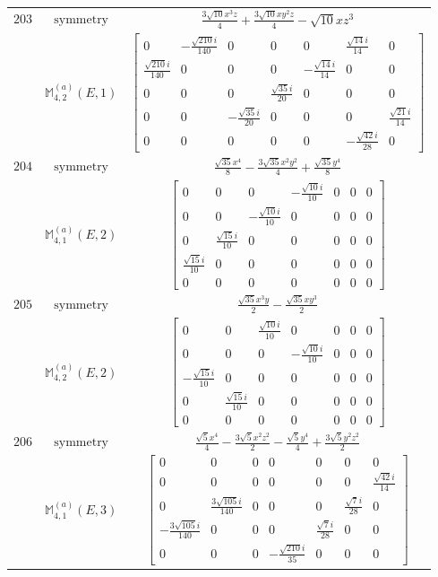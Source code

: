 \documentclass[fleqn,8pt,landscape]{jsarticle}
\begin{document}
\begin{longtable}{ccc}
$ 203 $ & $ \text{symmetry} $ & $ \frac{3 \sqrt{10} x^{3} z}{4} + \frac{3 \sqrt{10} x y^{2} z}{4} - \sqrt{10} x z^{3} $ \\
$  $ & $ \mathbb{M}_{4,2}^{(a)}(E,1) $ & $ \begin{bmatrix} 0 & - \frac{\sqrt{210} i}{140} & 0 & 0 & 0 & \frac{\sqrt{14} i}{14} & 0 \\ \frac{\sqrt{210} i}{140} & 0 & 0 & 0 & - \frac{\sqrt{14} i}{14} & 0 & 0 \\ 0 & 0 & 0 & \frac{\sqrt{35} i}{20} & 0 & 0 & 0 \\ 0 & 0 & - \frac{\sqrt{35} i}{20} & 0 & 0 & 0 & \frac{\sqrt{21} i}{14} \\ 0 & 0 & 0 & 0 & 0 & - \frac{\sqrt{42} i}{28} & 0 \end{bmatrix} $ \\ \hline
$ 204 $ & $ \text{symmetry} $ & $ \frac{\sqrt{35} x^{4}}{8} - \frac{3 \sqrt{35} x^{2} y^{2}}{4} + \frac{\sqrt{35} y^{4}}{8} $ \\
$  $ & $ \mathbb{M}_{4,1}^{(a)}(E,2) $ & $ \begin{bmatrix} 0 & 0 & 0 & - \frac{\sqrt{10} i}{10} & 0 & 0 & 0 \\ 0 & 0 & - \frac{\sqrt{10} i}{10} & 0 & 0 & 0 & 0 \\ 0 & \frac{\sqrt{15} i}{10} & 0 & 0 & 0 & 0 & 0 \\ \frac{\sqrt{15} i}{10} & 0 & 0 & 0 & 0 & 0 & 0 \\ 0 & 0 & 0 & 0 & 0 & 0 & 0 \end{bmatrix} $ \\ \hline
$ 205 $ & $ \text{symmetry} $ & $ \frac{\sqrt{35} x^{3} y}{2} - \frac{\sqrt{35} x y^{3}}{2} $ \\
$  $ & $ \mathbb{M}_{4,2}^{(a)}(E,2) $ & $ \begin{bmatrix} 0 & 0 & \frac{\sqrt{10} i}{10} & 0 & 0 & 0 & 0 \\ 0 & 0 & 0 & - \frac{\sqrt{10} i}{10} & 0 & 0 & 0 \\ - \frac{\sqrt{15} i}{10} & 0 & 0 & 0 & 0 & 0 & 0 \\ 0 & \frac{\sqrt{15} i}{10} & 0 & 0 & 0 & 0 & 0 \\ 0 & 0 & 0 & 0 & 0 & 0 & 0 \end{bmatrix} $ \\ \hline
$ 206 $ & $ \text{symmetry} $ & $ \frac{\sqrt{5} x^{4}}{4} - \frac{3 \sqrt{5} x^{2} z^{2}}{2} - \frac{\sqrt{5} y^{4}}{4} + \frac{3 \sqrt{5} y^{2} z^{2}}{2} $ \\
$  $ & $ \mathbb{M}_{4,1}^{(a)}(E,3) $ & $ \begin{bmatrix} 0 & 0 & 0 & 0 & 0 & 0 & 0 \\ 0 & 0 & 0 & 0 & 0 & 0 & \frac{\sqrt{42} i}{14} \\ 0 & \frac{3 \sqrt{105} i}{140} & 0 & 0 & 0 & \frac{\sqrt{7} i}{28} & 0 \\ - \frac{3 \sqrt{105} i}{140} & 0 & 0 & 0 & \frac{\sqrt{7} i}{28} & 0 & 0 \\ 0 & 0 & 0 & - \frac{\sqrt{210} i}{35} & 0 & 0 & 0 \end{bmatrix} $ \\ \hline

\end{longtable}
\end{document}
